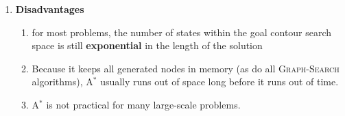 \begin{enumerate}[itemsep=0.2cm]
    \item \textbf{Disadvantages}
    \begin{enumerate}
        \item for most problems, the number of states within the goal contour search space is still \textbf{exponential} in the length of the solution
        \hfill \cite{ai/book/Artificial-Intelligence-A-Modern-Approach/Russell-Norvig}

        \item Because it keeps all generated nodes in memory (as do all \textsc{Graph-Search} algorithms), A$^\ast$ usually runs out of space long before it runs out of time.
        \hfill \cite{ai/book/Artificial-Intelligence-A-Modern-Approach/Russell-Norvig}

        \item A$^\ast$ is not practical for many large-scale problems. 
        \hfill \cite{ai/book/Artificial-Intelligence-A-Modern-Approach/Russell-Norvig}
    \end{enumerate}
\end{enumerate}


\vspace{0.5cm}

